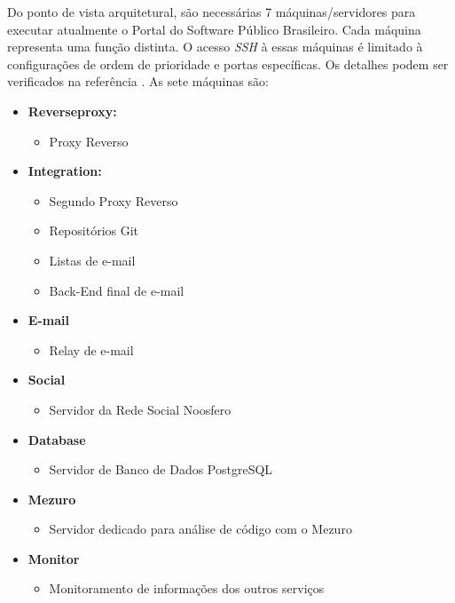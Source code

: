 Do ponto de vista arquitetural, são necessárias 7 máquinas/servidores para
executar atualmente o Portal do
Software Público Brasileiro. Cada máquina representa uma função distinta. O
acesso \textit{SSH} à essas máquinas é limitado à configurações de ordem de
prioridade e portas específicas. Os detalhes podem ser verificados na
referência \cite{archSPB}. As sete máquinas são:

\begin{itemize}
  \item \textbf{Reverseproxy:}
  \begin{itemize}
    \item Proxy Reverso
  \end{itemize}

  \item \textbf{Integration:}
    \begin{itemize}
      \item Segundo Proxy Reverso
      \item Repositórios Git
      \item Listas de e-mail
      \item Back-End final de e-mail
    \end{itemize}

  \item \textbf{E-mail}
  \begin{itemize}
    \item Relay de e-mail
  \end{itemize}

  \item \textbf{Social}
  \begin{itemize}
    \item Servidor da Rede Social Noosfero
  \end{itemize}

  \item \textbf{Database}
  \begin{itemize}
    \item{Servidor de Banco de Dados PostgreSQL}
  \end{itemize}

  \item \textbf{Mezuro}
  \begin{itemize}
    \item Servidor dedicado para análise de código com o Mezuro
  \end{itemize}

  \item \textbf{Monitor}
  \begin{itemize}
    \item Monitoramento de informações dos outros serviços
  \end{itemize}
\end{itemize}

